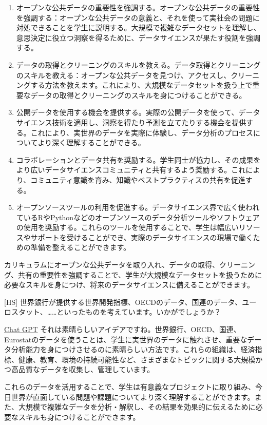 \documentclass[
]{book}
\theoremstyle{definition}
\theoremstyle{definition}
\theoremstyle{definition}
\theoremstyle{definition}
\theoremstyle{remark}
\begin{document}
\begin{enumerate}
\def\labelenumi{\arabic{enumi}.}
\item
  オープンな公共データの重要性を強調する。オープンな公共データの重要性を強調する：オープンな公共データの意義と、それを使って実社会の問題に対処できることを学生に説明する。大規模で複雑なデータセットを理解し、意思決定に役立つ洞察を得るために、データサイエンスが果たす役割を強調する。
\item
  データの取得とクリーニングのスキルを教える。データ取得とクリーニングのスキルを教える：オープンな公共データを見つけ、アクセスし、クリーニングする方法を教えます。これにより、大規模なデータセットを扱う上で重要なデータの取得とクリーニングのスキルを身につけることができる。
\item
  公開データを使用する機会を提供する。実際の公開データを使って、データサイエンス技術を適用し、洞察を得たり予測を立てたりする機会を提供する。これにより、実世界のデータを実際に体験し、データ分析のプロセスについてより深く理解することができる。
\item
  コラボレーションとデータ共有を奨励する。学生同士が協力し、その成果をより広いデータサイエンスコミュニティと共有するよう奨励する。これにより、コミュニティ意識を育み、知識やベストプラクティスの共有を促進する。
\item
  オープンソースツールの利用を促進する。データサイエンス界で広く使われているRやPythonなどのオープンソースのデータ分析ツールやソフトウェアの使用を奨励する。これらのツールを使用することで、学生は幅広いリソースやサポートを受けることができ、実際のデータサイエンスの現場で働くための準備を整えることができます。
\end{enumerate}

カリキュラムにオープンな公共データを取り入れ、データの取得、クリーニング、共有の重要性を強調することで、学生が大規模なデータセットを扱うために必要なスキルを身につけ、将来のデータサイエンスに備えることができます。

{[}HS{]} 世界銀行が提供する世界開発指標、OECDのデータ、国連のデータ、ユーロスタット、\ldots\ldots といったものを考えています。いかがでしょうか？

\protect\hyperlink{chatgpt}{Chat GPT} それは素晴らしいアイデアですね。世界銀行、OECD、国連、Eurostatのデータを使うことは、学生に実世界のデータに触れさせ、重要なデータ分析能力を身につけさせるのに素晴らしい方法です。これらの組織は、経済指標、健康、教育、環境の持続可能性など、さまざまなトピックに関する大規模かつ高品質なデータを収集し、管理しています。

これらのデータを活用することで、学生は有意義なプロジェクトに取り組み、今日世界が直面している問題や課題についてより深く理解することができます。また、大規模で複雑なデータを分析・解釈し、その結果を効果的に伝えるために必要なスキルも身につけることができます。
\end{document}
